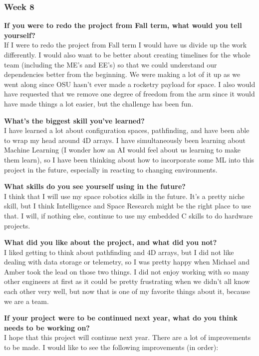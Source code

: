 \subsubsection{Week 8}
\textbf{If you were to redo the project from Fall term, what would you tell yourself?} \\ 
If I were to redo the project from Fall term I would have us divide up the work differently. I would also want to be better about creating timelines for the whole team (including the ME's and EE's) so that we could understand our dependencies better from the beginning. We were making a lot of it up as we went along since OSU hasn't ever made a rocketry payload for space. I also would have requested that we remove one degree of freedom from the arm since it would have made things a lot easier, but the challenge has been fun.

\textbf{What's the biggest skill you've learned?} \\ 
I have learned a lot about configuration spaces, pathfinding, and have been able to wrap my head around 4D arrays. I have simultaneously been learning about Machine Learning (I wonder how an AI would feel about us learning to make them learn), so I have been thinking about how to incorporate some ML into this project in the future, especially in reacting to changing environments.

\textbf{What skills do you see yourself using in the future?} \\ 
I think that I will use my space robotics skills in the future. It's a pretty niche skill, but I think Intelligence and Space Research might be the right place to use that. I will, if nothing else, continue to use my embedded C skills to do hardware projects.

\textbf{What did you like about the project, and what did you not?} \\ 
I liked getting to think about pathfinding and 4D arrays, but I did not like dealing with data storage or telemetry, so I was pretty happy when Michael and Amber took the lead on those two things. I did not enjoy working with so many other engineers at first as it could be pretty frustrating when we didn't all know each other very well, but now that is one of my favorite things about it, because we are a team.

\textbf{If your project were to be continued next year, what do you think needs to be working on?} \\ 
I hope that this project will continue next year. There are a lot of improvements to be made. I would like to see the following improvements (in order):


